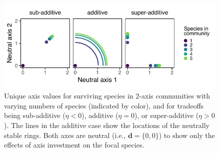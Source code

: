 \documentclass[12pt]{article}
\begin{document}
\begin{figure}[ht!]
\centering
\includegraphics{2-outcomes_q2.pdf}
\caption{Unique axis values for surviving species in 2-axis communities
with varying numbers of species (indicated by color), and 
    for tradeoffs being sub-additive ($\eta < 0$), additive ($\eta = 0$), or 
    super-additive ($\eta > 0$).
    The lines in the additive case show the locations of the neutrally stable rings.
    Both axes are neutral (i.e., $\mathbf{d} = \{ 0, 0 \}$) to show only
    the effects of axis investment on the focal species.}
\label{fig:two-axis-outcomes}
\end{figure}
\end{document}
